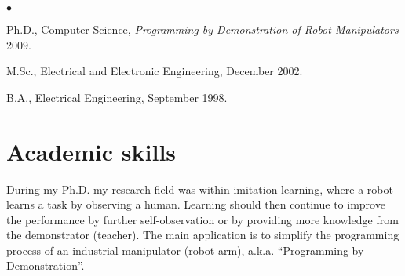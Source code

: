 \documentclass[a4paper,margin,line]{res} \usepackage{latexsym}
\newenvironment{list2}{
  \begin{list}{$\bullet$}{%
      \setlength{\itemsep}{0in} \setlength{\parsep}{0in}
      \setlength{\parskip}{0in} \setlength{\topsep}{0in}
      \setlength{\partopsep}{0in}
      \setlength{\leftmargin}{0.2in}}}{\end{list}}
\begin{document}
\begin{resume}
\vspace*{-.1in}
\begin{list2}
\item Ph.D., Computer Science, {\it Programming by Demonstration of
  Robot Manipulators} 2009.
\vspace*{.03in}
\item M.Sc., Electrical and Electronic Engineering, December 2002.
\vspace*{.03in}
\item B.A., Electrical Engineering, September 1998.
\end{list2}

\section{\sc Academic skills}
During my Ph.D. my research field was within imitation learning, where
a robot learns a task by observing a human.  Learning should then
continue to improve the performance by further self-observation or by
providing more knowledge from the demonstrator (teacher). The main
application is to simplify the programming process of an industrial
manipulator (robot arm), a.k.a. ``Programming-by-Demonstration''.






\end{resume}
\end{document}
